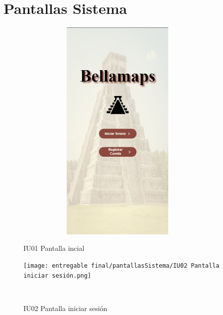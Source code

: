\section{Pantallas Sistema}
\begin{figure}[htb]
    \begin{minipage}{1\textwidth}
    \centering
    \includegraphics[width=10cm, height=11cm]{entregable final/pantallasSistema/IU01 Pantalla incial.png}
    \caption{IU01 Pantalla incial}
\end{minipage}

    \begin{minipage}{1\textwidth}
        \centering
        \texttt{[image: entregable final/pantallasSistema/IU02 Pantalla iniciar sesión.png]}
        \caption{IU02 Pantalla iniciar sesión}
    \end{minipage}
    \\
\end{figure}

